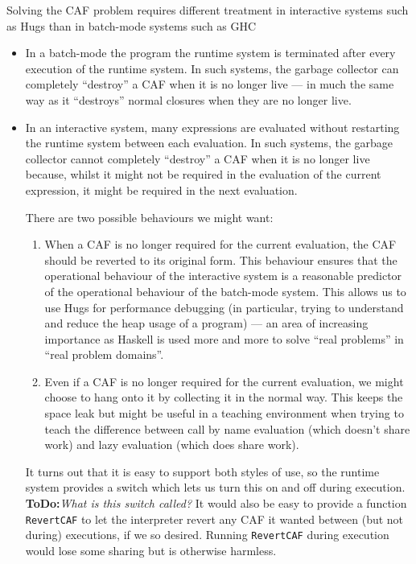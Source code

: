 \documentclass[11pt]{article}
\newcommand{\ToDo}[1]{{{\bf ToDo:}\sl #1}}
\begin{document}
Solving the CAF problem requires different treatment in interactive
systems such as Hugs than in batch-mode systems such as GHC 
\begin{itemize}
\item
In a batch-mode the program the runtime system is terminated
after every execution of the runtime system.  In such systems,
the garbage collector can completely ``destroy'' a CAF when it 
is no longer live --- in much the same way as it ``destroys''
normal closures when they are no longer live.

\item
In an interactive system, many expressions are evaluated without
restarting the runtime system between each evaluation.  In such
systems, the garbage collector cannot completely ``destroy'' a CAF
when it is no longer live because, whilst it might not be required in
the evaluation of the current expression, it might be required in the
next evaluation.

There are two possible behaviours we might want:
\begin{enumerate}
\item
When a CAF is no longer required for the current evaluation, the CAF
should be reverted to its original form.  This behaviour ensures that
the operational behaviour of the interactive system is a reasonable
predictor of the operational behaviour of the batch-mode system.  This
allows us to use Hugs for performance debugging (in particular, trying
to understand and reduce the heap usage of a program) --- an area of
increasing importance as Haskell is used more and more to solve ``real
problems'' in ``real problem domains''.

\item
Even if a CAF is no longer required for the current evaluation, we might
choose to hang onto it by collecting it in the normal way.  This keeps
the space leak but might be useful in a teaching environment when
trying to teach the difference between call by name evaluation (which
doesn't share work) and lazy evaluation (which does share work).

\end{enumerate}

It turns out that it is easy to support both styles of use, so the
runtime system provides a switch which lets us turn this on and off
during execution.  \ToDo{What is this switch called?}  It would also
be easy to provide a function \verb+RevertCAF+ to let the interpreter
revert any CAF it wanted between (but not during) executions, if we so
desired.  Running \verb+RevertCAF+ during execution would lose some sharing
but is otherwise harmless.

\end{itemize}
\end{document}
